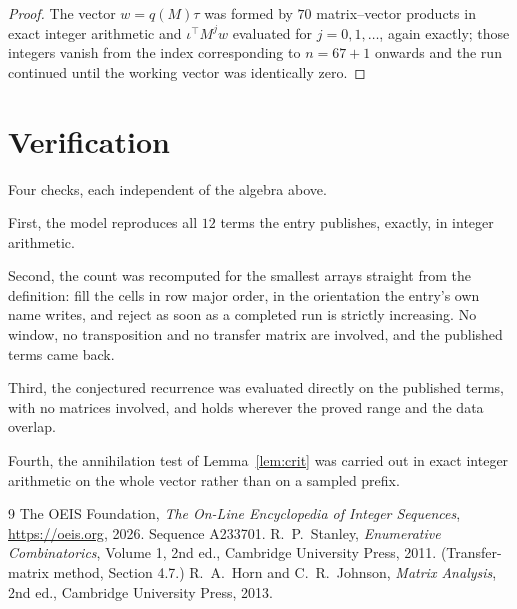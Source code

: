 \documentclass[11pt,a4paper]{article}
\theoremstyle{plain}
\theoremstyle{definition}
\begin{document}
\begin{proof}
The vector $w=q(M)\tau$ was formed by $70$ matrix--vector products in exact integer
arithmetic and $\iota^{\!\top}M^{j}w$ evaluated for $j=0,1,\dots$, again exactly; those
integers vanish from the index corresponding to $n=67+1$ onwards and the run continued
until the working vector was identically zero.
\end{proof}

\section{Verification}

Four checks, each independent of the algebra above.

First, the model reproduces all $12$ terms the entry publishes, exactly, in integer
arithmetic.

Second, the count was recomputed for the smallest arrays straight from the definition: fill the
cells in row major order, in the orientation the entry's own name writes, and reject as soon as
a completed run is strictly increasing. No window, no transposition and no transfer matrix are involved, and
the published terms came back.

Third, the conjectured recurrence was evaluated directly on the published terms, with no
matrices involved, and holds wherever the proved range and the data overlap.

Fourth, the annihilation test of Lemma~\ref{lem:crit} was carried out in exact integer
arithmetic on the whole vector rather than on a sampled prefix.

\begin{thebibliography}{9}
 The OEIS Foundation, \emph{The On-Line Encyclopedia of Integer
Sequences}, \url{https://oeis.org}, 2026. Sequence A233701.
 R.~P.~Stanley, \emph{Enumerative Combinatorics}, Volume 1, 2nd ed.,
Cambridge University Press, 2011. (Transfer-matrix method, Section 4.7.)
 R.~A.~Horn and C.~R.~Johnson, \emph{Matrix Analysis}, 2nd ed., Cambridge
University Press, 2013.
\end{thebibliography}
\end{document}
